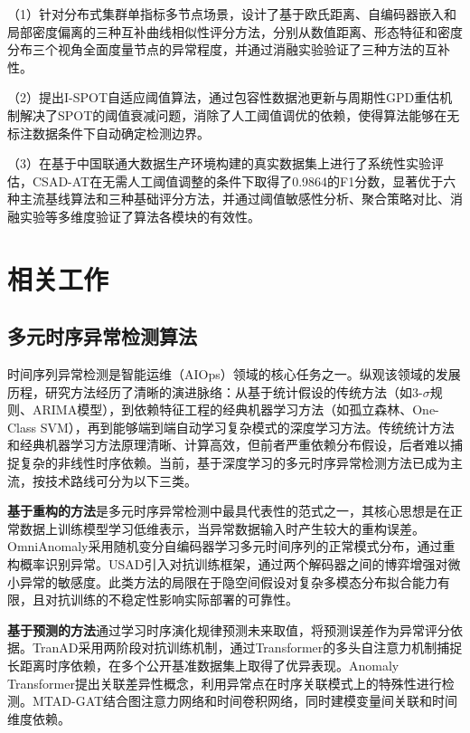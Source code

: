 \documentclass[10.5pt,a4paper,twocolumn]{ctexart}
\begin{document}
（1）针对分布式集群单指标多节点场景，设计了基于欧氏距离、自编码器嵌入和局部密度偏离的三种互补曲线相似性评分方法，分别从数值距离、形态特征和密度分布三个视角全面度量节点的异常程度，并通过消融实验验证了三种方法的互补性。

（2）提出I-SPOT自适应阈值算法，通过包容性数据池更新与周期性GPD重估机制解决了SPOT的阈值衰减问题，消除了人工阈值调优的依赖，使得算法能够在无标注数据条件下自动确定检测边界。

（3）在基于中国联通大数据生产环境构建的真实数据集上进行了系统性实验评估，CSAD-AT在无需人工阈值调整的条件下取得了0.9864的F1分数，显著优于六种主流基线算法和三种基础评分方法，并通过阈值敏感性分析、聚合策略对比、消融实验等多维度验证了算法各模块的有效性。


\section{相关工作}

\subsection{多元时序异常检测算法}

时间序列异常检测是智能运维（AIOps）领域的核心任务之一\cite{pei2017mlops}。纵观该领域的发展历程，研究方法经历了清晰的演进脉络：从基于统计假设的传统方法（如3-$\sigma$规则、ARIMA模型\cite{box1970arima}），到依赖特征工程的经典机器学习方法（如孤立森林\cite{liu2008isolation}、One-Class SVM\cite{scholkopf2001ocsvm}），再到能够端到端自动学习复杂模式的深度学习方法\cite{choi2021deepreview,pang2021deepsurvey}。传统统计方法和经典机器学习方法原理清晰、计算高效，但前者严重依赖分布假设，后者难以捕捉复杂的非线性时序依赖。当前，基于深度学习的多元时序异常检测方法已成为主流，按技术路线可分为以下三类。

\textbf{基于重构的方法}是多元时序异常检测中最具代表性的范式之一，其核心思想是在正常数据上训练模型学习低维表示，当异常数据输入时产生较大的重构误差。OmniAnomaly\cite{su2019omni}采用随机变分自编码器学习多元时间序列的正常模式分布，通过重构概率识别异常。USAD\cite{audibert2020usad}引入对抗训练框架，通过两个解码器之间的博弈增强对微小异常的敏感度。此类方法的局限在于隐空间假设对复杂多模态分布拟合能力有限，且对抗训练的不稳定性影响实际部署的可靠性。

\textbf{基于预测的方法}通过学习时序演化规律预测未来取值，将预测误差作为异常评分依据。TranAD\cite{tuli2022tranad}采用两阶段对抗训练机制，通过Transformer的多头自注意力机制捕捉长距离时序依赖，在多个公开基准数据集上取得了优异表现。Anomaly Transformer\cite{xu2022anomaly}提出关联差异性概念，利用异常点在时序关联模式上的特殊性进行检测。MTAD-GAT\cite{zhao2020mtadgat}结合图注意力网络和时间卷积网络，同时建模变量间关联和时间维度依赖。
\end{document}
